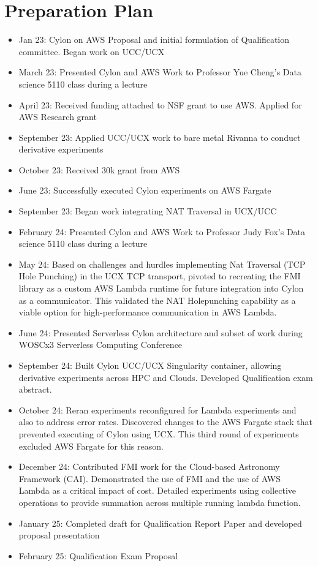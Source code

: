 \section{Preparation Plan}
\label{sec:plan}

\begin{itemize}

\item Jan 23: Cylon on AWS Proposal and initial formulation of Qualification committee.  Began work on UCC/UCX 
\item March 23: Presented Cylon and AWS Work to Professor Yue Cheng's Data science 5110 class during a lecture
\item April 23: Received funding attached to NSF grant to use AWS. Applied for AWS Research grant
\item September 23: Applied UCC/UCX work to bare metal Rivanna to conduct derivative experiments
\item October 23: Received 30k grant from AWS
\item June 23: Successfully executed Cylon experiments on AWS Fargate
\item September 23: Began work integrating NAT Traversal in UCX/UCC
\item February 24: Presented Cylon and AWS Work to Professor Judy Fox's Data science 5110 class during a lecture
\item May 24:  Based on challenges and hurdles implementing Nat Traversal (TCP Hole Punching) in the UCX TCP transport, pivoted to recreating the FMI library as a custom AWS Lambda runtime for future integration into Cylon as a communicator.  This validated the NAT Holepunching capability as a viable option for high-performance communication in AWS Lambda.
\item June 24: Presented Serverless Cylon architecture and subset of work during WOSCx3 Serverless Computing Conference
\item September 24: Built Cylon UCC/UCX Singularity container, allowing derivative experiments across HPC and Clouds.  Developed Qualification exam abstract.
\item October 24: Reran experiments reconfigured for Lambda experiments and also to address error rates.  Discovered changes to the AWS Fargate stack that prevented executing of Cylon using UCX.  This third round of experiments excluded AWS Fargate for this reason.
\item December 24: Contributed FMI work for the Cloud-based Astronomy Framework (CAI).  Demonstrated the use of FMI and the use of AWS Lambda as a critical impact of cost.  Detailed experiments using collective operations to provide summation across multiple running lambda function.
\item January 25: Completed draft for Qualification Report Paper and developed proposal presentation
\item February 25: Qualification Exam Proposal
\end{itemize}